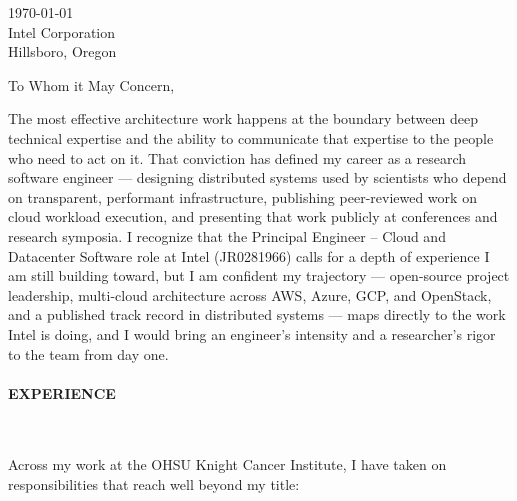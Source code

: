 



\textcolor{my-grey}{\dotfill}
\bigbreak

{\today}\\
Intel Corporation\\
Hillsboro, Oregon

\vspace*{2\baselineskip}

To Whom it May Concern,

\vspace*{\baselineskip}

The most effective architecture work happens at the boundary between deep technical expertise and the ability to communicate that expertise to the people who need to act on it. That conviction has defined my career as a research software engineer --- designing distributed systems used by scientists who depend on transparent, performant infrastructure, publishing peer-reviewed work on cloud workload execution, and presenting that work publicly at conferences and research symposia. I recognize that the Principal Engineer -- Cloud and Datacenter Software role at Intel (JR0281966) calls for a depth of experience I am still building toward, but I am confident my trajectory --- open-source project leadership, multi-cloud architecture across AWS, Azure, GCP, and OpenStack, and a published track record in distributed systems --- maps directly to the work Intel is doing, and I would bring an engineer's intensity and a researcher's rigor to the team from day one.

\paragraph{EXPERIENCE}\

\vspace*{\baselineskip}

Across my work at the OHSU Knight Cancer Institute, I have taken on responsibilities that reach well beyond my title:

